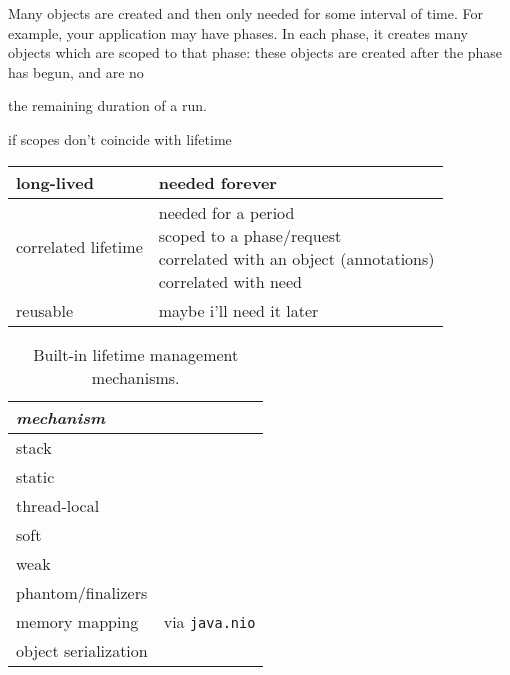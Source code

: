  



Many objects are created and then only needed for some interval of time.  
For example, your application may have phases. In each phase, it creates many objects which are scoped to that phase: these objects are created
after the phase has begun, and are no  


the remaining duration of a run.


if scopes don't coincide with lifetime

\begin{table}
\centering
\begin{tabular}{|l|l|} \hline
long-lived & needed forever \\ \hline 
correlated lifetime & \shortstack{needed for a period\\ 
scoped to a phase/request\\
correlated with an object (annotations)\\
correlated with need}\\ \hline
reusable & maybe i'll need it later \\ \hline
\end{tabular}
\end{table}


\begin{table}
\centering
\begin{tabular}{|l|l|} \hline
\em mechanism & \\ \hline \hline
stack & \\ \hline 
static & \\ \hline
thread-local & \\ \hline
soft & \\ \hline
weak & \\ \hline
phantom/finalizers & \\ \hline
memory mapping & via \texttt{java.nio} \\ \hline 
object serialization & \\ \hline
\end{tabular}
\caption{Built-in lifetime management mechanisms.}
\label{tab:builtin-lifetime-management}
\end{table}

